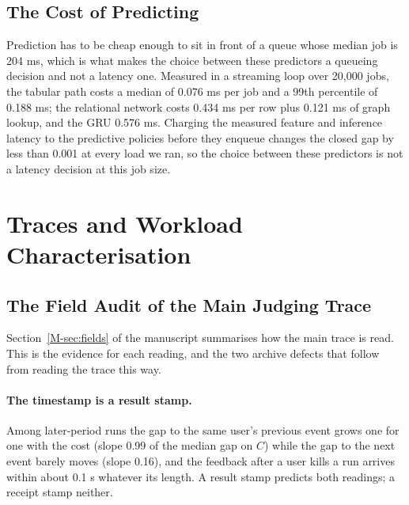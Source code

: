 \documentclass[mathematics,supfile,submit,moreauthors]{Definitions/mdpi}
\newcommand{\devnum}[1]{#1}
\begin{document}


\subsection{The Cost of Predicting}
\label{sec:supp_predcost}

Prediction has to be cheap enough to sit in front of a queue whose median job is
\devnum{204} ms, which is what makes the choice between these predictors a queueing
decision and not a latency one. Measured in a streaming loop over \devnum{20{,}000} jobs, the
tabular path costs a median of \devnum{0.076} ms per job and a 99th percentile of
\devnum{0.188} ms; the relational network costs \devnum{0.434} ms per row plus
\devnum{0.121} ms of graph lookup, and the GRU \devnum{0.576} ms. Charging the measured
feature and inference latency to the predictive policies before they enqueue changes the
closed gap by less than \devnum{0.001} at every load we ran, so the choice between these
predictors is not a latency decision at this job size.


\section{Traces and Workload Characterisation}
\label{sec:supp_data}

\subsection{The Field Audit of the Main Judging Trace}

Section~\ref*{M-sec:fields} of the manuscript summarises how the main trace is read. This is
the evidence for each reading, and the two archive defects that follow from reading the
trace this way.

\paragraph{The timestamp is a result stamp.}
Among later-period runs the gap to the same user's previous event grows one for one with
the cost (slope \devnum{0.99} of the median gap on $C$) while the gap to the next event
barely moves (slope \devnum{0.16}), and the feedback after a user kills a run arrives
within about \devnum{0.1} s whatever its length. A result stamp predicts both readings; a
receipt stamp neither.
\end{document}
